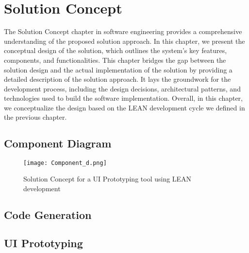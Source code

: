 
\chapter{Solution Concept}

\ifpdf
    \graphicspath{{Chapters/Solution-Concept/Figs/}{Chapters/Solution-Concept/Figs/}{Chapters/Solution-Concept/Figs/}}
\else
    \graphicspath{{Chapters/Solution-Concept/Figs/}{Chapters/Solution-Concept/Figs/}}
\fi
The Solution Concept chapter in software engineering provides a comprehensive understanding of the proposed solution approach. 
In this chapter, we present the conceptual design of the solution, which outlines the system's key features, components, and functionalities. 
This chapter bridges the gap between the solution design and the actual implementation of the solution by providing a detailed description of the solution approach. 
It lays the groundwork for the development process, including the design decisions, architectural patterns, and technologies used to build the software implementation. 
Overall, in this chapter, we conceptualize the design based on the LEAN development cycle we defined in the previous chapter.

\section{Component Diagram}
\label{sc:section:componentD}
\begin{figure}[htbp!]
    \centering    
    \texttt{[image: Component\_d.png]}
    \caption[Copmponent Diagram]{Solution Concept for a UI Prototyping tool using LEAN development}
    \label{fig:sc:componentD}
\end{figure}

\section{Code Generation}
\label{sc:section:codeGeneration}

\section{UI Prototyping}
\label{sc:section:prototyping}

